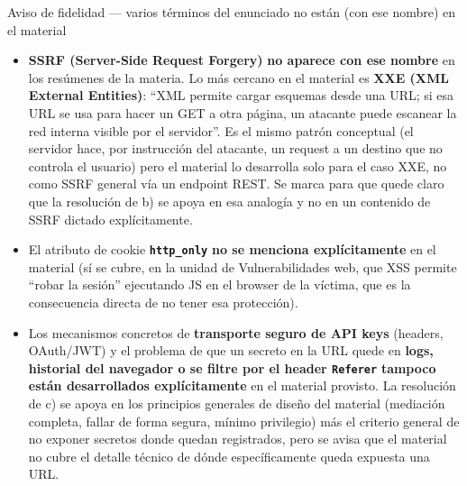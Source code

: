 \begin{warnbox}{Aviso de fidelidad --- varios términos del enunciado no están (con ese nombre) en el material}
\begin{itemize}
  \item \textbf{SSRF (Server-Side Request Forgery)} \textbf{no aparece con ese nombre}
  en los resúmenes de la materia. Lo más cercano en el material es \textbf{XXE (XML
  External Entities)}: ``XML permite cargar esquemas desde una URL; si esa URL se usa
  para hacer un GET a otra página, un atacante puede escanear la red interna visible por
  el servidor''. Es el mismo patrón conceptual (el servidor hace, por instrucción del
  atacante, un request a un destino que no controla el usuario) pero el material lo
  desarrolla solo para el caso XXE, no como SSRF general vía un endpoint REST. Se marca
  para que quede claro que la resolución de b) se apoya en esa analogía y no en un
  contenido de SSRF dictado explícitamente.
  \item El atributo de cookie \textbf{\texttt{http\_only}} \textbf{no se menciona
  explícitamente} en el material (sí se cubre, en la unidad de Vulnerabilidades web, que
  XSS permite ``robar la sesión'' ejecutando JS en el browser de la víctima, que es la
  consecuencia directa de no tener esa protección).
  \item Los mecanismos concretos de \textbf{transporte seguro de API keys} (headers,
  OAuth/JWT) y el problema de que un secreto en la URL quede en \textbf{logs, historial
  del navegador o se filtre por el header \texttt{Referer}} \textbf{tampoco están
  desarrollados explícitamente} en el material provisto. La resolución de c) se apoya en
  los principios generales de diseño del material (mediación completa, fallar de forma
  segura, mínimo privilegio) más el criterio general de no exponer secretos donde quedan
  registrados, pero se avisa que el material no cubre el detalle técnico de dónde
  específicamente queda expuesta una URL.
\end{itemize}
\end{warnbox}

